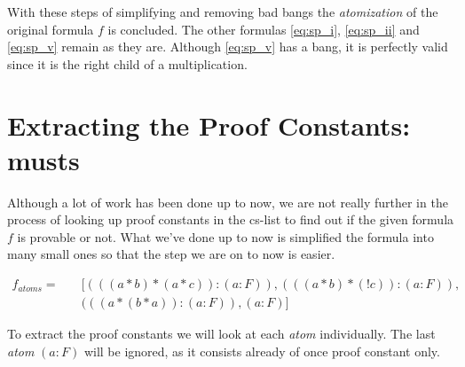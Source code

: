 \bigskip

With these steps of simplifying and removing bad bangs the \emph{atomization} of the original formula $f$ is concluded. The other formulas \ref{eq:sp_i}, \ref{eq:sp_ii} and \ref{eq:sp_v} remain as they are. Although \ref{eq:sp_v} has a bang, it is perfectly valid since it is the right child of a multiplication.


\section{Extracting the Proof Constants: musts}

Although a lot of work has been done up to now, we are not really further in the process of looking up proof constants in the cs-list to find out if the given formula $f$ is provable or not. What we've done up to now is simplified the formula into many small ones so that the step we are on to now is easier.

\begin{equation}\label{example_atoms}
\begin{split}
	f_{atoms} = \quad &[(((a * b)*(a * c)):(a:F)),(((a * b)*(! c)):(a:F)),\\
	&  (((a*(b * a)):(a:F)), (a:F)]
\end{split}
\end{equation}

To extract the proof constants we will look at each \emph{atom} individually. The last \emph{atom} $(a:F)$ will be ignored, as it consists already of once proof constant only.

